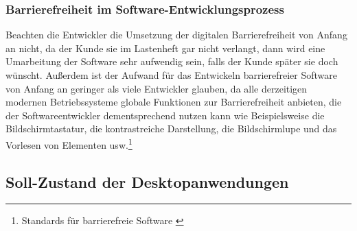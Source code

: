 

\subsubsection{Barrierefreiheit im Software-Entwicklungsprozess}
Beachten die Entwickler die Umsetzung der digitalen Barrierefreiheit von Anfang an nicht, da der Kunde sie im Lastenheft gar nicht verlangt, dann wird eine Umarbeitung der Software sehr aufwendig sein, falls der Kunde später sie doch wünscht. Außerdem ist der Aufwand für das Entwickeln barrierefreier Software von Anfang an geringer als viele Entwickler glauben, da alle  derzeitigen modernen Betriebssysteme globale Funktionen zur Barrierefreiheit anbieten, die der Softwareentwickler dementsprechend nutzen kann wie Beispielsweise die Bildschirmtastatur, die kontrastreiche Darstellung, die Bildschirmlupe und das Vorlesen von Elementen usw.\footnote{Standards für barrierefreie Software \cite{DEVINSIDER}}


\subsection{Soll-Zustand der Desktopanwendungen}
\label{subsec: Soll-Zustand der Desktopanwendungen}
